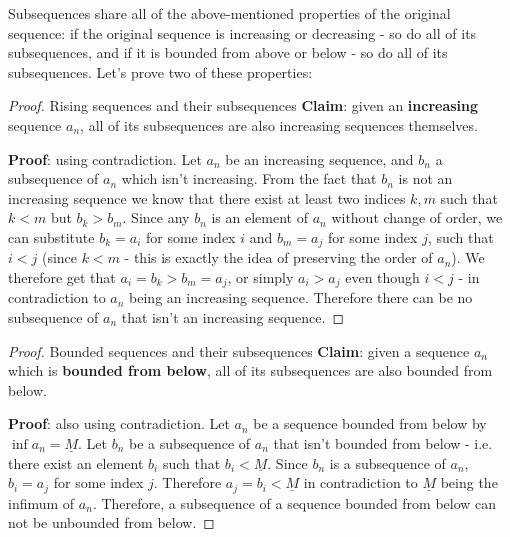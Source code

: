 Subsequences share all of the above-mentioned properties of the original sequence: if the original sequence is increasing or decreasing - so do all of its subsequences, and if it is bounded from above or below - so do all of its subsequences. Let's prove two of these properties:

\begin{proof}{Rising sequences and their subsequences}{}
	\textbf{Claim}: given an \textbf{increasing} sequence $a_{n}$, all of its subsequences are also increasing sequences themselves.

	\vspace{1em}
	\textbf{Proof}: using contradiction. Let $a_{n}$ be an increasing sequence, and $b_{n}$ a subsequence of $a_{n}$ which isn't increasing. From the fact that $b_{n}$ is not an increasing sequence we know that there exist at least two indices $k,m$ such that $k<m$ but $b_{k}>b_{m}$. Since any $b_{n}$ is an element of $a_{n}$ without change of order, we can substitute $b_{k}=a_{i}$ for some index $i$ and $b_{m}=a_{j}$ for some index $j$, such that $i<j$ (since $k<m$ - this is exactly the idea of preserving the order of $a_{n}$). We therefore get that $a_{i}=b_{k}>b_{m}=a_{j}$, or simply $a_{i}>a_{j}$ even though $i<j$ - in contradiction to $a_{n}$ being an increasing sequence. Therefore there can be no subsequence of $a_{n}$ that isn't an increasing sequence.
\end{proof}

\begin{proof}{Bounded sequences and their subsequences}{}
	\textbf{Claim}: given a sequence $a_{n}$ which is \textbf{bounded from below}, all of its subsequences are also bounded from below.

	\vspace{1em}
	\textbf{Proof}: also using contradiction. Let $a_{n}$ be a sequence bounded from below by $\inf a_{n}=\underline{M}$. Let $b_{n}$ be a subsequence of $a_{n}$ that isn't bounded from below - i.e. there exist an element $b_{i}$ such that $b_{i}<\underline{M}$. Since $b_{n}$ is a subsequence of $a_{n}$, $b_{i}=a_{j}$ for some index $j$. Therefore $a_{j}=b_{i}<\underline{M}$ in contradiction to $\underline{M}$ being the infimum of $a_{n}$. Therefore, a subsequence of a sequence bounded from below can not be unbounded from below.
\end{proof}


